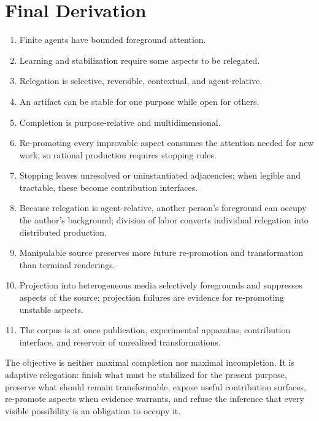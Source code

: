 \documentclass[11pt,openany]{book}
\begin{document}
\chapter*{Final Derivation}
\begin{enumerate}
\item Finite agents have bounded foreground attention.
\item Learning and stabilization require some aspects to be relegated.
\item Relegation is selective, reversible, contextual, and agent-relative.
\item An artifact can be stable for one purpose while open for others.
\item Completion is purpose-relative and multidimensional.
\item Re-promoting every improvable aspect consumes the attention needed
  for new work, so rational production requires stopping rules.
\item Stopping leaves unresolved or uninstantiated adjacencies; when
  legible and tractable, these become contribution interfaces.
\item Because relegation is agent-relative, another person's foreground can
  occupy the author's background; division of labor converts individual
  relegation into distributed production.
\item Manipulable source preserves more future re-promotion and
  transformation than terminal renderings.
\item Projection into heterogeneous media selectively foregrounds and
  suppresses aspects of the source; projection failures are evidence for
  re-promoting unstable aspects.
\item The corpus is at once publication, experimental apparatus,
  contribution interface, and reservoir of unrealized transformations.
\end{enumerate}
The objective is neither maximal completion nor maximal incompletion. It is
adaptive relegation: finish what must be stabilized for the present
purpose, preserve what should remain transformable, expose useful
contribution surfaces, re-promote aspects when evidence warrants, and
refuse the inference that every visible possibility is an obligation to
occupy it.

% 
% 
\end{document}
